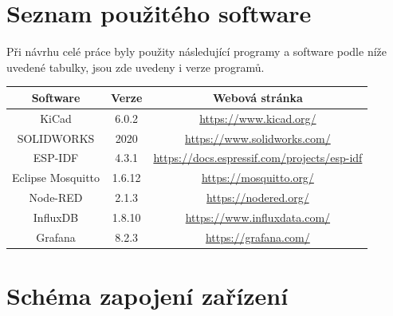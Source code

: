\chapter{Seznam použitého software}

Při návrhu celé práce byly použity následující programy a software podle níže uvedené tabulky, jsou zde uvedeny i verze programů.

\bigskip
\begin{table}[!ht]
    \centering
    \begin{tabular}{|c|c|c|}
    \hline
        Software & Verze & Webová stránka \\ \hline
        KiCad & 6.0.2 & \href{https://www.kicad.org/}{https://www.kicad.org/} \\ \hline
        SOLIDWORKS & 2020 & \href{https://www.solidworks.com/}{https://www.solidworks.com/} \\ \hline
        ESP-IDF & 4.3.1 & \href{https://docs.espressif.com/projects/esp-idf}{https://docs.espressif.com/projects/esp-idf} \\ \hline
        Eclipse Mosquitto & 1.6.12 & \href{https://mosquitto.org/}{https://mosquitto.org/} \\ \hline
        Node-RED & 2.1.3 & \href{https://nodered.org/}{https://nodered.org/} \\ \hline
        InfluxDB & 1.8.10 & \href{https://www.influxdata.com/}{https://www.influxdata.com/} \\ \hline
        Grafana & 8.2.3 & \href{https://grafana.com/}{https://grafana.com/} \\ \hline
    \end{tabular}
\end{table}


\chapter{Schéma zapojení zařízení}



